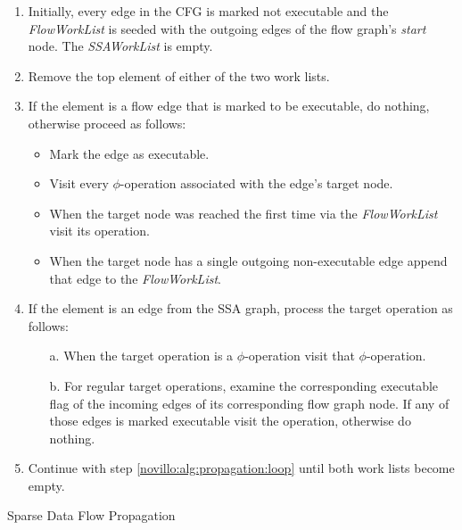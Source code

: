 \begin{algorithm}[t!]
  \begin{enumerate}
    \item Initially, every edge in the CFG is marked not executable and the
          \emph{FlowWorkList} is seeded with the outgoing edges of the flow
          graph's \emph{start} node.  The \emph{SSAWorkList} is empty.
    \item \label{novillo:alg:propagation:loop} Remove the top element of either
          of the two work lists.
    \item \label{novillo:alg:propagation:flowedge} If the element is a flow edge
          that is marked to be executable, do nothing, \\ otherwise proceed as
          follows:
          \begin{itemize}
            \item Mark the edge as executable.
            \item Visit every $\phi$-operation associated with the edge's target
                  node.
            \item When the target node was reached the first time via the
                  \emph{FlowWorkList} visit its operation.
            \item When the target node has a single outgoing non-executable edge
                  append that edge to the \emph{FlowWorkList}.
          \end{itemize}
    \item \label{novillo:alg:propagation:ssaedge} If the element is an edge from
          the SSA graph, process the target operation as follows:
          \begin{enumerate}
            \item[a.] When the target operation is a $\phi$-operation visit that
                      $\phi$-operation.
            \item[b.] \label{novillo:alg:propagation:ssaedge:regular} For
                      regular target operations, examine the corresponding
                      executable flag of the incoming edges of its corresponding
                      flow graph node. If any of those edges is marked
                      executable visit the operation, otherwise do nothing.
          \end{enumerate}
    \item Continue with step \ref{novillo:alg:propagation:loop} until both work
          lists become empty.
    \vspace{-1em}
  \end{enumerate}

  \caption{Sparse Data Flow Propagation}
  \label{novillo:alg:propagation}
\end{algorithm}

